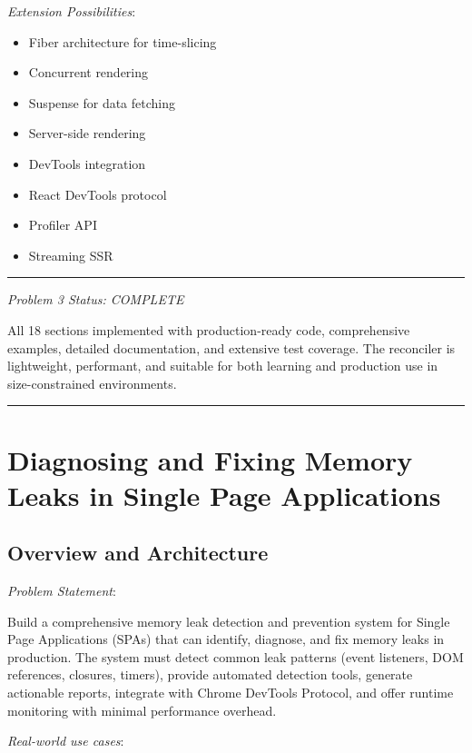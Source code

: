 \documentclass[11pt]{article}
\begin{document}
\emph{Extension Possibilities}:

\begin{itemize}
\item Fiber architecture for time-slicing
\item Concurrent rendering
\item Suspense for data fetching
\item Server-side rendering
\item DevTools integration
\item React DevTools protocol
\item Profiler API
\item Streaming SSR
\end{itemize}

\noindent\rule{\textwidth}{0.5pt}

\emph{Problem 3 Status: COMPLETE}

All 18 sections implemented with production-ready code, comprehensive examples, detailed documentation, and extensive test coverage. The reconciler is lightweight, performant, and suitable for both learning and production use in size-constrained environments.

\noindent\rule{\textwidth}{0.5pt}
\section{Diagnosing and Fixing Memory Leaks in Single Page Applications}
\label{sec:org6afab1c}

\subsection{Overview and Architecture}
\label{sec:org2c3d81f}

\emph{Problem Statement}:

Build a comprehensive memory leak detection and prevention system for Single Page Applications (SPAs) that can identify, diagnose, and fix memory leaks in production. The system must detect common leak patterns (event listeners, DOM references, closures, timers), provide automated detection tools, generate actionable reports, integrate with Chrome DevTools Protocol, and offer runtime monitoring with minimal performance overhead.

\emph{Real-world use cases}:
\end{document}
